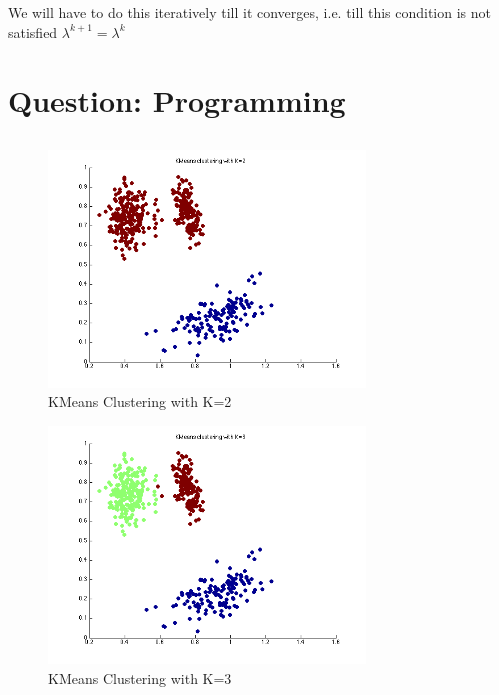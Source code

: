\documentclass[paper=a4, fontsize=11pt]{scrartcl} %
\numberwithin{equation}{section} %
\numberwithin{figure}{section} %
\numberwithin{table}{section} %
\begin{document}
We will have to do this iteratively till it converges, i.e. till this condition is not satisfied $\lambda^{k+1} = \lambda^{k}$


\newpage
\section{Question: Programming}
\subsection{}
\subsection{}
\subsubsection{}
\begin{figure}[h!]
  \centering
    \includegraphics[width=0.75\textwidth]{../figures/k2.png}
  \caption{KMeans Clustering with K=2}
\end{figure}

\begin{figure}[h!]
  \centering
    \includegraphics[width=0.75\textwidth]{../figures/k3.png}
  \caption{KMeans Clustering with K=3}
\end{figure}
\end{document}
